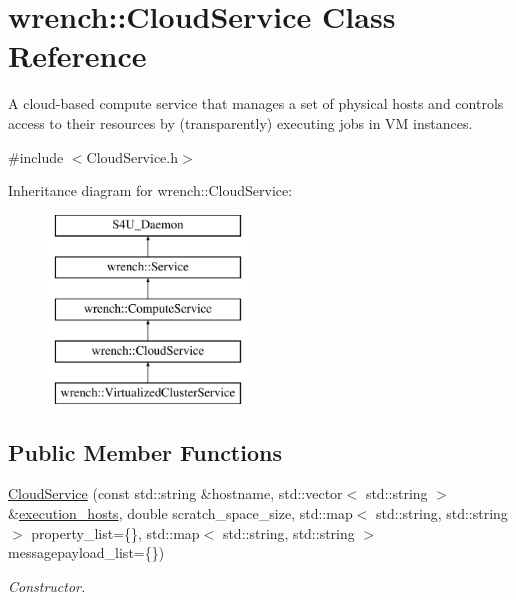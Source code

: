 \hypertarget{classwrench_1_1_cloud_service}{}\section{wrench\+:\+:Cloud\+Service Class Reference}
\label{classwrench_1_1_cloud_service}


A cloud-\/based compute service that manages a set of physical hosts and controls access to their resources by (transparently) executing jobs in VM instances.  




{\ttfamily \#include $<$Cloud\+Service.\+h$>$}

Inheritance diagram for wrench\+:\+:Cloud\+Service\+:\begin{figure}[H]
\begin{center}
\leavevmode
\includegraphics[height=5.000000cm]{classwrench_1_1_cloud_service}
\end{center}
\end{figure}
\subsection*{Public Member Functions}
\begin{DoxyCompactItemize}
\item 
\hyperlink{classwrench_1_1_cloud_service_a9f7f2d8bbbcaf2cd1c2cc881d11afec3}{Cloud\+Service} (const std\+::string \&hostname, std\+::vector$<$ std\+::string $>$ \&\hyperlink{classwrench_1_1_cloud_service_a8225cae457e491f3f3aad32653910ea0}{execution\+\_\+hosts}, double scratch\+\_\+space\+\_\+size, std\+::map$<$ std\+::string, std\+::string $>$ property\+\_\+list=\{\}, std\+::map$<$ std\+::string, std\+::string $>$ messagepayload\+\_\+list=\{\})
\begin{DoxyCompactList}\small\item\em Constructor. \end{DoxyCompactList}\end{DoxyCompactItemize}
